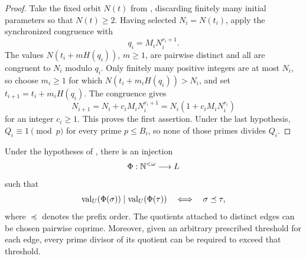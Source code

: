 \begin{proof}
  Take the fixed orbit \(N(t)\) from
  , discarding finitely many
  initial parameters so that \(N(t)\ge2\). Having selected
  \(N_i=N(t_i)\), apply the synchronized congruence with
  \[
    q_i=M_iN_i^{r_i+1}.
  \]
  The values \(N(t_i+mH(q_i))\), \(m\ge1\), are pairwise distinct and all
  are congruent to \(N_i\) modulo \(q_i\). Only finitely many positive
  integers are at most \(N_i\), so choose \(m_i\ge1\) for which
  \(N(t_i+m_iH(q_i))>N_i\), and set
  \(t_{i+1}=t_i+m_iH(q_i)\). The congruence gives
  \[
    N_{i+1}=N_i+c_iM_iN_i^{r_i+1}
           =N_i(1+c_iM_iN_i^{r_i})
  \]
  for an integer \(c_i\ge1\). This proves the first assertion. Under
  the last hypothesis, \(Q_i\equiv1\pmod p\) for every prime
  \(p\le B_i\), so none of those primes divides \(Q_i\).
\end{proof}

\begin{corollary}
  \label{thm:unit-mcfl-divisibility-tree}
  Under the hypotheses of
  , there is an injection
  \[
    \Phi:\mathbb{N}^{<\omega}\longrightarrow L
  \]
  such that
  \[
    \operatorname{val}_U(\Phi(\sigma))\mid\operatorname{val}_U(\Phi(\tau))
      \quad\Longleftrightarrow\quad \sigma\preceq\tau,
  \]
  where \(\preceq\) denotes the prefix order. The quotients attached to
  distinct edges can be chosen pairwise coprime. Moreover, given an
  arbitrary prescribed threshold for each edge, every prime divisor of
  its quotient can be required to exceed that threshold.
\end{corollary}

